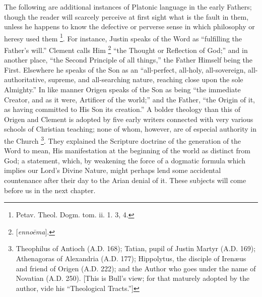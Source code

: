The following are additional instances of Platonic language in the
early Fathers; though the reader will scarcely perceive at first sight
what is the fault in them, unless he happens to know the
defective or perverse sense in which philosophy or heresy used them \footnote{Petav. Theol. Dogm. tom. ii. 1. 3, 4.}. For instance, Justin speaks of the Word as ``fulfilling
the Father's will.'' Clement calls Him \footnote{[\emph{enno\={e}ma}].} ``the Thought or Reflection of God;'' and in another
place, ``the Second Principle of all things,'' the Father
Himself being the First. Elsewhere he speaks of the Son as an
``all-perfect, all-holy, all-sovereign, all-authoritative,
supreme, and all-searching nature, reaching close upon the sole
Almighty.'' In like manner Origen speaks of the Son as being
``the immediate Creator, and as it were, Artificer of the
world;'' and the Father, ``the Origin of it, as having
committed to His Son its creation.'' A bolder theology than this
of Origen and Clement is adopted by five early writers connected with
very various schools of Christian teaching; none of whom, however, are
of especial authority in the Church \footnote{Theophilus of Antioch (A.D.
168); Tatian, pupil of Justin Martyr (A.D. 169);
Athenagoras of Alexandria (A.D. 177); Hippolytus,
the disciple of Irenæus and friend of Origen (A.D.
222); and the Author who goes under the name of Novatian (A.D.
250). [This is Bull's view; for that maturely adopted by the author,
vide his ``Theological Tracts.'']}. They explained the Scripture doctrine of the generation of
the Word to mean, His manifestation at the beginning of the world as
distinct from God; a statement, which, by weakening the force of a
dogmatic formula which implies our Lord's Divine Nature, might perhaps
lend some accidental countenance after their day to the Arian denial
of it. These subjects will come before us in the next chapter.

